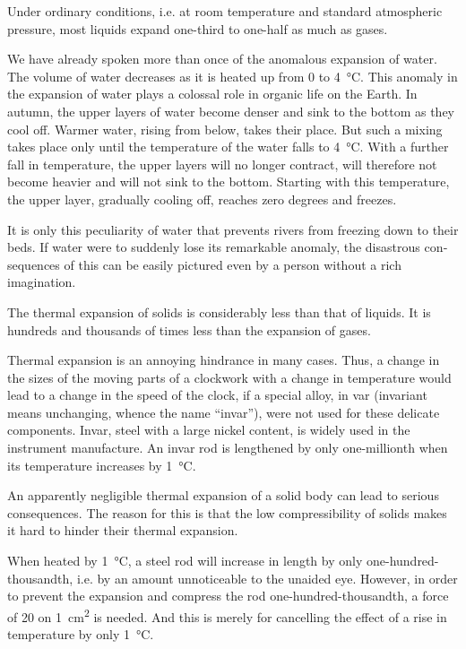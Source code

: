 Under ordinary conditions, i.e. at room temperature and standard atmospheric pressure, most liquids expand one-third to one-half as much as gases.

We have already spoken more than once of the anoma­lous expansion of water. The volume of water decreases as it is heated up from 0 to \SI{4}{\celsius}. This anomaly in the expansion of water plays a colossal role in organic life on the Earth. In autumn, the upper layers of water become denser and sink to the bottom as they cool off. Warmer water, rising from below, takes their place. But such a mixing takes place only until the temperature of the water falls to \SI{4}{\celsius}. With a further fall in temperature, the upper layers will no longer contract, will therefore not become heavier and will not sink to the bottom. Starting with this temperature, the upper layer, gradually cooling off, reaches zero degrees and freezes.

It is only this peculiarity of water that prevents rivers from freezing down to their beds. If water were to sud­denly lose its remarkable anomaly, the disastrous con­sequences of this can be easily pictured even by a person without a rich imagination.


The thermal expansion of solids is considerably less than that of liquids. It is hundreds and thousands of times less than the expansion of gases.

Thermal expansion is an annoying hindrance in many cases. Thus, a change in the sizes of the moving parts of a clockwork with a change in temperature would lead to a change in the speed of the clock, if a special alloy, in­ var (invariant means unchanging, whence the name ``invar''), were not used for these delicate components. Invar, steel with a large nickel content, is widely used in the instrument manufacture. An invar rod is lengthened by only one-millionth when its temperature increases by \SI{1}{\celsius}.

An apparently negligible thermal expansion of a solid body can lead to serious consequences. The reason for this is that the low compressibility of solids makes it hard to hinder their thermal expansion.

When heated by \SI{1}{\celsius}, a steel rod will increase in length by only one-hundred-thousandth, i.e. by an amount unnoticeable to the unaided eye. However, in order to prevent the expansion and compress the rod one-hundred-thousandth, a force of \SI{20}{\kgf} on \SI{1}{\centi\meter\squared} is needed. And this is merely for cancelling the effect of a rise in temperature by only \SI{1}{\celsius}.

